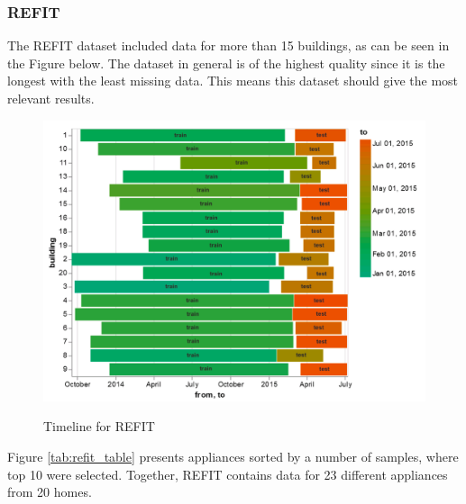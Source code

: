 \subsubsection{REFIT}
The REFIT \cite{REFIT} dataset included data for more than 15 buildings, as can be seen in the Figure below.
The dataset in general is of the highest quality since it is the longest with the least missing data.
This means this dataset should give the most relevant results.
\begin{figure}[H]
	\centering
	\caption{Timeline for REFIT}
	\includegraphics[width=1\textwidth]{Figures/EC/refit_timeline.png}
	\label{fig:refit_timeline}
\end{figure}

Figure \ref{tab:refit_table} presents appliances sorted by a number of samples, where top 10 were selected.
Together, REFIT contains data for 23 different appliances from 20 homes.

